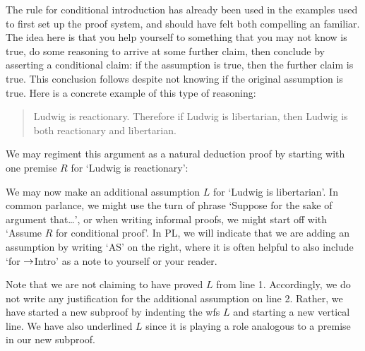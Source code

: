 The rule for conditional introduction has already been used in the examples used to first set up the proof system, and should have felt both compelling an familiar.
The idea here is that you help yourself to something that you may not know is true, do some reasoning to arrive at some further claim, then conclude by asserting a conditional claim: if the assumption is true, then the further claim is true.
This conclusion follows despite not knowing if the original assumption is true.
Here is a concrete example of this type of reasoning:
	\begin{quote}
		Ludwig is reactionary. Therefore if Ludwig is libertarian, then Ludwig is both reactionary and libertarian.
	\end{quote}
We may regiment this argument as a natural deduction proof by starting with one premise $R$ for `Ludwig is reactionary':
	\begin{fitchproof}
		 \pr{}
	\end{fitchproof}
We may now make an additional assumption $L$ for `Ludwig is libertarian'.
In common parlance, we might use the turn of phrase `Suppose for the sake of argument that\ldots', or when writing informal proofs, we might start off with `Assume $R$ for conditional proof'.
In PL, we will indicate that we are adding an assumption by writing `AS' on the right, where it is often helpful to also include `for $\rightarrow$Intro' as a note to yourself or your reader.
	\begin{fitchproof}
		 \pr{}
		\open
			 \as{for \eif Intro}{}
	\end{fitchproof}

Note that we are not claiming to have proved $L$ from line 1.
Accordingly, we do not write any justification for the additional assumption on line 2.
Rather, we have started a new subproof by indenting the wfs $L$ and starting a new vertical line.
We have also underlined $L$ since it is playing a role analogous to a premise in our new subproof. 

